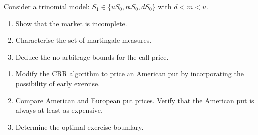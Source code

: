 \begin{exercise}
Consider a trinomial model: $S_1 \in \{uS_0, mS_0, dS_0\}$ with $d < m < u$.
\begin{enumerate}
    \item Show that the market is incomplete.
    \item Characterise the set of martingale measures.
    \item Deduce the no-arbitrage bounds for the call price.
\end{enumerate}
\end{exercise}

\begin{exercise}
\begin{enumerate}
    \item Modify the CRR algorithm to price an American put by incorporating
          the possibility of early exercise.
    \item Compare American and European put prices. Verify that the American
          put is always at least as expensive.
    \item Determine the optimal exercise boundary.
\end{enumerate}
\end{exercise}
